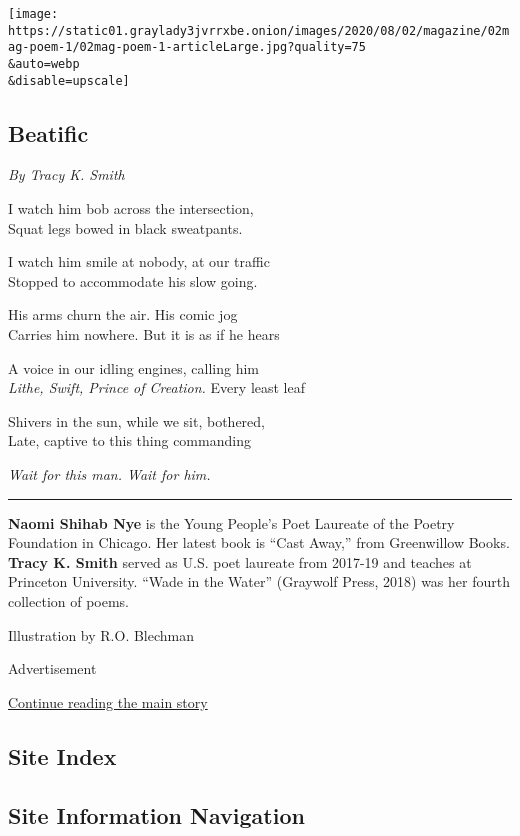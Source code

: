 \texttt{[image: https://static01.graylady3jvrrxbe.onion/images/2020/08/02/magazine/02mag-poem-1/02mag-poem-1-articleLarge.jpg?quality=75\\\&auto=webp\\\&disable=upscale]}

\hypertarget{beatific}{%
\subsection{Beatific}\label{beatific}}

\emph{By Tracy K. Smith}

I watch him bob across the intersection,\\
Squat legs bowed in black sweatpants.

I watch him smile at nobody, at our traffic\\
Stopped to accommodate his slow going.

His arms churn the air. His comic jog\\
Carries him nowhere. But it is as if he hears

A voice in our idling engines, calling him\\
\emph{Lithe, Swift, Prince of Creation.} Every least leaf

Shivers in the sun, while we sit, bothered,\\
Late, captive to this thing commanding

\emph{Wait for this man. Wait for him.}

\begin{center}\rule{0.5\linewidth}{\linethickness}\end{center}

\textbf{Naomi Shihab Nye} is the Young People's Poet Laureate of the
Poetry Foundation in Chicago. Her latest book is ``Cast Away,'' from
Greenwillow Books. \textbf{Tracy K. Smith} served as U.S. poet laureate
from 2017-19 and teaches at Princeton University. ``Wade in the Water''
(Graywolf Press, 2018) was her fourth collection of poems.

Illustration by R.O. Blechman

Advertisement

\protect\hyperlink{after-bottom}{Continue reading the main story}

\hypertarget{site-index}{%
\subsection{Site Index}\label{site-index}}

\hypertarget{site-information-navigation}{%
\subsection{Site Information
Navigation}\label{site-information-navigation}}

